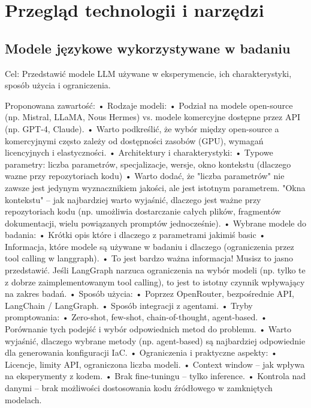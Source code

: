 \clearpage %

\section{Przegląd technologii i narzędzi}

\subsection{Modele językowe wykorzystywane w badaniu}

Cel: Przedstawić modele LLM używane w eksperymencie, ich charakterystyki, sposób użycia i ograniczenia.

Proponowana zawartość:
	•	Rodzaje modeli:
	•	    Podział na modele open-source (np. Mistral, LLaMA, Nous Hermes) vs. modele komercyjne dostępne przez API (np. GPT-4, Claude).
	•		Warto podkreślić, że wybór między open-source a komercyjnymi często zależy od dostępności zasobów (GPU), wymagań licencyjnych i elastyczności.
	•	Architektury i charakterystyki:
	•	    Typowe parametry: liczba parametrów, specjalizacje, wersje, okno kontekstu (dlaczego wazne przy repozytoriach kodu)
	•		Warto dodać, że "liczba parametrów" nie zawsze jest jedynym wyznacznikiem jakości, ale jest istotnym parametrem. "Okna kontekstu" – jak najbardziej warto wyjaśnić, dlaczego jest ważne przy repozytoriach kodu (np. umożliwia dostarczanie całych plików, fragmentów dokumentacji, wielu powiązanych promptów jednocześnie).
    •   Wybrane modele do badania:
    •       Krótki opis które i dlaczego z parametrami jakimiś basic
	• 		Informacja, które modele są używane w badaniu i dlaczego (ograniczenia przez tool calling w langgraph).
	•		To jest bardzo ważna informacja! Musisz to jasno przedstawić. Jeśli LangGraph narzuca ograniczenia na wybór modeli (np. tylko te z dobrze zaimplementowanym tool calling), to jest to istotny czynnik wpływający na zakres badań.
	•	Sposób użycia:
	•	    Poprzez OpenRouter, bezpośrednie API, LangChain / LangGraph.
	•	    Sposób integracji z agentami.
	•	Tryby promptowania:
	•	    Zero-shot, few-shot, chain-of-thought, agent-based.
	•	    Porównanie tych podejść i wybór odpowiednich metod do problemu.
	•		Warto wyjaśnić, dlaczego wybrane metody (np. agent-based) są najbardziej odpowiednie dla generowania konfiguracji IaC.
	•	Ograniczenia i praktyczne aspekty:
	•	    Licencje, limity API, ograniczona liczba modeli.
	•	    Context window – jak wpływa na eksperymenty z kodem.
	•	    Brak fine-tuningu – tylko inference.
	•	    Kontrola nad danymi – brak możliwości dostosowania kodu źródłowego w zamkniętych modelach.



